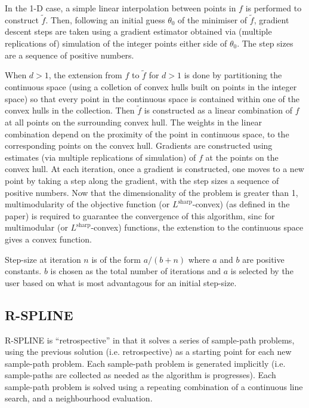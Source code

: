 \documentclass{article}
\begin{document}
In the 1-D case, a simple linear interpolation between points in $f$ is performed to construct $\tilde{f}$. Then, following an initial guess $\theta_0$ of the minimiser of $\tilde{f}$, gradient descent steps are taken using a gradient estimator obtained via (multiple replications of) simulation of the integer points either side of $\theta_0$. The step sizes are a sequence of positive numbers. \newline

When $d>1$, the extension from $f$ to $\tilde{f}$ for $d>1$ is done by partitioning the continuous space (using a colletion of convex hulls built on points in the integer space) so that every point in the continuous space is contained within one of the convex hulls in the collection. Then $\tilde{f}$ is constructed as a linear combination of $f$ at all points on the surrounding convex hull. The weights in the linear combination depend on the proximity of the point in continuous space, to the corresponding points on the convex hull. Gradients are constructed using estimates (via multiple replications of simulation) of $f$ at the points on the convex hull. At each iteration, once a gradient is constructed, one moves to a new point by taking a step along the gradient, with the step sizes a sequence of positive numbers. Now that the dimensionality of the problem is greater than 1, multimodularity of the objective function (or $L^{\text{sharp}}$-convex) (as defined in the paper) is required to guarantee the convergence of this algorithm, sinc for multimodular (or $L^{\text{sharp}}$-convex) functions, the extenstion to the continuous space gives a convex function. \newline

Step-size at iteration $n$ is of the form $a/(b+n)$ where $a$ and $b$ are positive constants. $b$ is chosen as the total number of iterations and $a$ is selected by the user based on what is most advantagous for an initial step-size. 

\subsection{R-SPLINE}

R-SPLINE is ``retrospective'' in that it solves a series of sample-path problems, using the previous solution (i.e. retrospective) as a starting point for each new sample-path problem. Each sample-path problem is generated implicitly (i.e. sample-paths are collected as needed as the algorithm is progresses). Each sample-path problem is solved using a repeating combination of a continuous line search, and a neighbourhood evaluation. \newline
\end{document}

